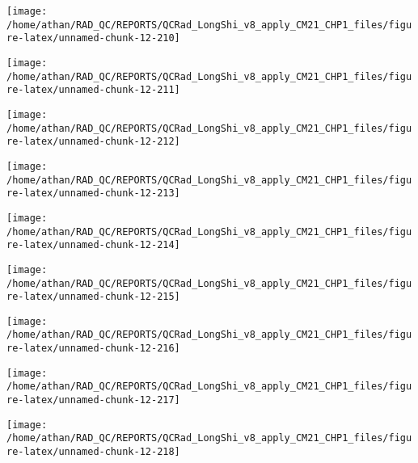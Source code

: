 \documentclass[
  10pt,
  a4paper,oneside]{article}
\begin{document}
\begin{center}\texttt{[image: /home/athan/RAD\_QC/REPORTS/QCRad\_LongShi\_v8\_apply\_CM21\_CHP1\_files/figure-latex/unnamed-chunk-12-210]} \end{center}

\begin{center}\texttt{[image: /home/athan/RAD\_QC/REPORTS/QCRad\_LongShi\_v8\_apply\_CM21\_CHP1\_files/figure-latex/unnamed-chunk-12-211]} \end{center}

\begin{center}\texttt{[image: /home/athan/RAD\_QC/REPORTS/QCRad\_LongShi\_v8\_apply\_CM21\_CHP1\_files/figure-latex/unnamed-chunk-12-212]} \end{center}

\begin{center}\texttt{[image: /home/athan/RAD\_QC/REPORTS/QCRad\_LongShi\_v8\_apply\_CM21\_CHP1\_files/figure-latex/unnamed-chunk-12-213]} \end{center}

\begin{center}\texttt{[image: /home/athan/RAD\_QC/REPORTS/QCRad\_LongShi\_v8\_apply\_CM21\_CHP1\_files/figure-latex/unnamed-chunk-12-214]} \end{center}

\begin{center}\texttt{[image: /home/athan/RAD\_QC/REPORTS/QCRad\_LongShi\_v8\_apply\_CM21\_CHP1\_files/figure-latex/unnamed-chunk-12-215]} \end{center}

\begin{center}\texttt{[image: /home/athan/RAD\_QC/REPORTS/QCRad\_LongShi\_v8\_apply\_CM21\_CHP1\_files/figure-latex/unnamed-chunk-12-216]} \end{center}

\begin{center}\texttt{[image: /home/athan/RAD\_QC/REPORTS/QCRad\_LongShi\_v8\_apply\_CM21\_CHP1\_files/figure-latex/unnamed-chunk-12-217]} \end{center}

\begin{center}\texttt{[image: /home/athan/RAD\_QC/REPORTS/QCRad\_LongShi\_v8\_apply\_CM21\_CHP1\_files/figure-latex/unnamed-chunk-12-218]} \end{center}
\end{document}
